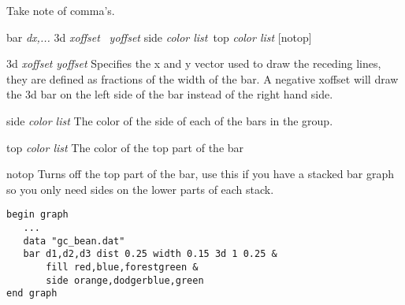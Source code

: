 Take note of comma's.
\begin{commanddescription}
\item[{\sf bar {\it dx,...} 3d {\it xoffset} \  {\it yoffset} side {\it color list}\ top {\it color list} [notop]}]
   
 

\item[{\sf 3d  {\it xoffset} {\it yoffset} }]
Specifies the x and y vector used to draw the receding
lines, they are defined as fractions of the width of the
bar.
A negative xoffset will draw the 3d bar on the left side
of the bar instead of the right hand side.

\item[{\sf side {\it color list} }]
The color of the side of each of the bars in the group.

\item[{\sf top {\it color list}}]
The color of the top part of the bar

\item[{\sf notop}]
Turns off the top part of the bar, use this if you have
a stacked bar graph so you only need sides on the lower parts
of each stack.

\begin{minipage}[c]{8cm}
\begin{Verbatim}
begin graph
   ...
   data "gc_bean.dat"
   bar d1,d2,d3 dist 0.25 width 0.15 3d 1 0.25 &
       fill red,blue,forestgreen &
       side orange,dodgerblue,green
end graph
\end{Verbatim}
\end{minipage}
\hfill
\begin{minipage}[c]{7cm}
\mbox{}
\end{minipage}
\end{commanddescription}


